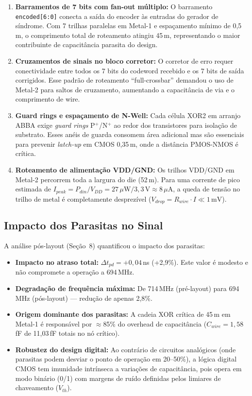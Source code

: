 \documentclass[12pt,a4paper]{article}
\begin{document}
\begin{enumerate}[leftmargin=2em,label=\textbf{RC\arabic*.}]
  \item \textbf{Barramentos de 7 bits com fan-out múltiplo:} O barramento \texttt{encoded[6:0]} conecta a saída do encoder às entradas do gerador de síndrome. Com 7 trilhas paralelas em Metal-1 e espaçamento mínimo de 0,5\,\textmu m, o comprimento total de roteamento atingiu 45\,\textmu m, representando o maior contribuinte de capacitância parasita do design.

  \item \textbf{Cruzamentos de sinais no bloco corretor:} O corretor de erro requer conectividade entre todos os 7 bits do codeword recebido e os 7 bits de saída corrigidos. Esse padrão de roteamento ``full-crossbar'' demandou o uso de Metal-2 para saltos de cruzamento, aumentando a capacitância de via e o comprimento de wire.

  \item \textbf{Guard rings e espaçamento de N-Well:} Cada célula XOR2 em arranjo ABBA exige \textit{guard rings} P$^+$/N$^+$ ao redor dos transistores para isolação de substrato. Esses anéis de guarda consomem área adicional mas são essenciais para prevenir \textit{latch-up} em CMOS 0,35\,\textmu m, onde a distância PMOS-NMOS é crítica.

  \item \textbf{Roteamento de alimentação VDD/GND:} Os trilhos VDD/GND em Metal-2 percorrem toda a largura do die (52\,\textmu m). Para uma corrente de pico estimada de $I_{peak} = P_{din}/V_{DD} = 27\,\mu\text{W}/3{,}3\,\text{V} \approx 8\,\mu\text{A}$, a queda de tensão no trilho de metal é completamente desprezível ($V_{drop} = R_{wire} \cdot I \ll 1\,\text{mV}$).
\end{enumerate}

\subsection{Impacto dos Parasitas no Sinal}

A análise pós-layout (Seção~8) quantificou o impacto dos parasitas:

\begin{itemize}[leftmargin=1.5em]
  \item \textbf{Impacto no atraso total:} $\Delta t_{pd} = +0{,}04$\,ns (+2,9\%). Este valor é modesto e não compromete a operação a 694\,MHz.
  \item \textbf{Degradação de frequência máxima:} De 714\,MHz (pré-layout) para 694\,MHz (pós-layout) --- redução de apenas 2,8\%.
  \item \textbf{Origem dominante dos parasitas:} A cadeia XOR crítica de 45\,\textmu m em Metal-1 é responsável por $\approx$85\% do overhead de capacitância ($C_{wire} = 1{,}58$\,fF de 11,03\,fF totais no nó crítico).
  \item \textbf{Robustez do design digital:} Ao contrário de circuitos analógicos (onde parasitas podem desviar o ponto de operação em 20--50\%), a lógica digital CMOS tem imunidade intrínseca a variações de capacitância, pois opera em modo binário (0/1) com margens de ruído definidas pelos limiares de chaveamento ($V_{th}$).
\end{itemize}
\end{document}
